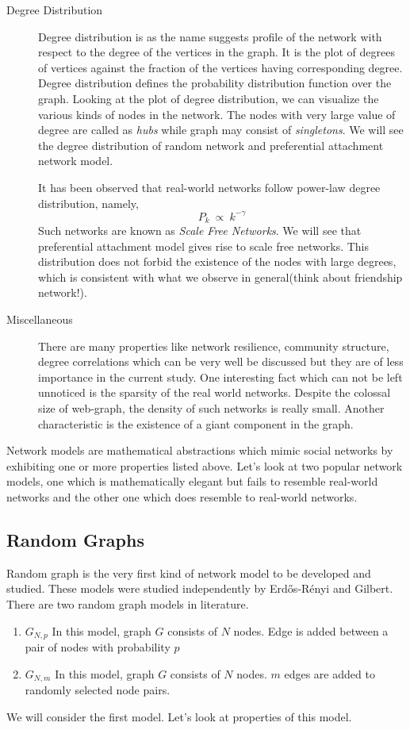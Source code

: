 \documentclass[12pt]{article}
\begin{document}
\begin{description}
	\item[Degree Distribution]
	\par Degree distribution is as the name suggests profile of the network with respect to the degree of the vertices in the graph. It is the plot of degrees of vertices against the fraction of the vertices having corresponding degree. Degree distribution defines the probability distribution function over the graph. Looking at the plot of degree distribution, we can visualize the various kinds of nodes in the network. The nodes with very large value of degree are called as {\it hubs} while graph may consist of {\it singletons}. We will see the degree distribution of random network and preferential attachment network model.
	\par It has been observed that real-world networks follow power-law degree distribution, namely,
	\[
		P_k ~\propto~ k^{-\gamma}
	\]
	Such networks are known as {\it Scale Free Networks}. We will see that preferential attachment model gives rise to scale free networks. This distribution does not forbid the existence of the nodes with large degrees, which is consistent with what we observe in general(think about friendship network!).

	\item[Miscellaneous]
	\par There are many properties like network resilience, community structure, degree correlations which can be very well be discussed but they are of less importance in the current study. One interesting fact which can not be left unnoticed is the sparsity of the real world networks. Despite the colossal size of web-graph, the density of such networks is really small. Another characteristic is the existence of a giant component in the graph.

\end{description}
Network models are mathematical abstractions which mimic social networks by exhibiting one or more properties listed above. Let's look at two popular network models, one which is mathematically elegant but fails to resemble real-world networks and the other one which does resemble to real-world networks.

\subsection{Random Graphs}
Random graph is the very first kind of network model to be developed and studied. These models were studied independently by Erd\H{o}s-R\'enyi\cite{erdos} and Gilbert\cite{gilbert}. There are two random graph models in literature.
\begin{enumerate}
	\item $G_{N,p}$ In this model, graph $G$ consists of $N$ nodes. Edge is added between a pair of nodes with probability $p$
	\item $G_{N,m}$ In this model, graph $G$ consists of $N$ nodes. $m$ edges are added to randomly selected node pairs.
\end{enumerate}
We will consider the first model. Let's look at properties of this model.
\end{document}
